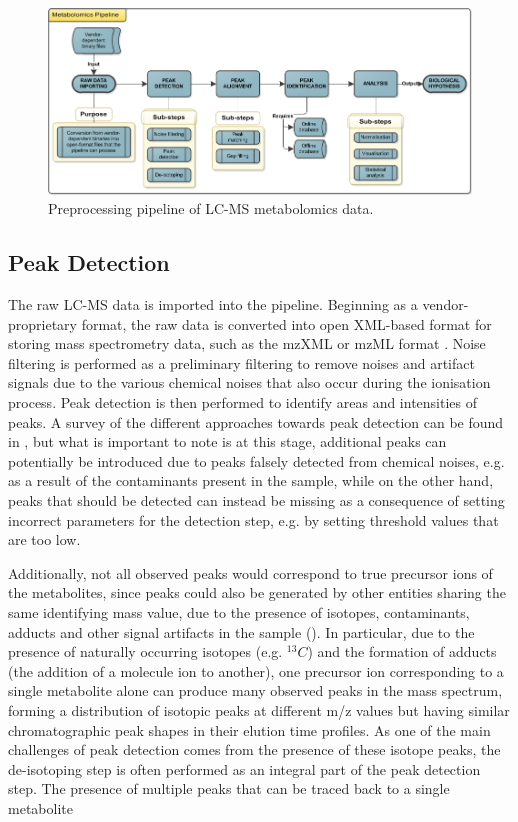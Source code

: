 \begin{figure}[htb!]
\noindent \centering{}\includegraphics[width=1\textwidth]{02-background/figures/Drawing1}\caption{\label{fig:Preprocessing-pipeline-of}Preprocessing pipeline of LC-MS metabolomics data.}
\end{figure}

\subsection{Peak Detection\label{sub:related-peaks}}

The raw LC-MS data is imported into the pipeline. Beginning as a vendor-proprietary format, the raw data is converted into open XML-based format for storing mass spectrometry data, such as the mzXML or mzML format \cite{Pedrioli2004}. Noise filtering is performed as a preliminary filtering to remove noises and artifact signals due to the various chemical noises that also occur during the ionisation process. Peak detection is then performed to identify areas and intensities of peaks. A survey of the different approaches towards peak detection can be found in \cite{Zhang2009}, but what is important to note is at this stage, additional peaks can potentially be introduced due to peaks falsely detected from chemical noises, e.g. as a result of the contaminants present in the sample, while on the other hand, peaks that should be detected can instead be missing as a consequence of setting incorrect parameters for the detection step, e.g. by setting threshold values that are too low. 

Additionally, not all observed peaks would correspond to true precursor ions of the metabolites, since peaks could also be generated by other entities sharing the same identifying mass value, due to the presence of isotopes, contaminants, adducts and other signal artifacts in the sample (\cite{Keller2008}). In particular, due to the presence of naturally occurring isotopes (e.g. $^{13}C$) and the formation of adducts (the addition of a molecule ion to another), one precursor ion corresponding to a single metabolite alone can produce many observed peaks in the mass spectrum, forming a distribution of isotopic peaks at different m/z values but having similar chromatographic peak shapes in their elution time profiles. As one of the main challenges of peak detection comes from the presence of these isotope peaks, the de-isotoping step is often performed as an integral part of the peak detection step. The presence of multiple peaks that can be traced back to a single metabolite 

